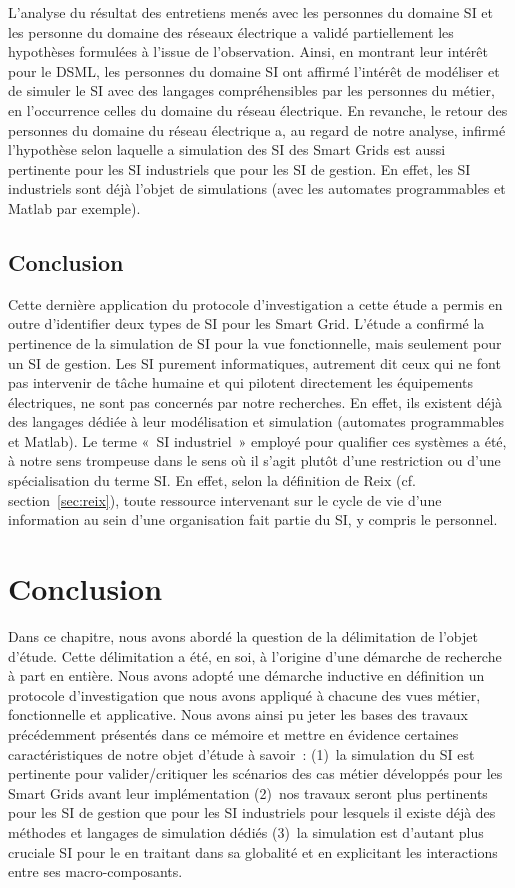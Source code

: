 L'analyse du résultat des entretiens menés avec les personnes du domaine SI et
les personne du domaine des réseaux électrique a validé partiellement les
hypothèses formulées à l'issue de l'observation. Ainsi, en montrant leur intérêt
pour le DSML, les personnes du domaine SI ont affirmé l'intérêt de modéliser et
de simuler le SI avec des langages compréhensibles par les personnes du métier,
en l'occurrence celles du domaine du réseau électrique.  En revanche, le retour
des personnes du domaine du réseau électrique a, au regard de notre analyse,
infirmé l'hypothèse selon laquelle a simulation des SI des Smart Grids est aussi
pertinente pour les SI industriels que pour les SI de gestion. En effet, les SI
industriels sont déjà l'objet de simulations (avec les automates programmables
et Matlab par exemple).

            \subsection{Conclusion} Cette dernière application du protocole
d'investigation a cette étude a permis en outre d'identifier deux types de SI
pour les Smart Grid. L'étude a confirmé la pertinence de la simulation de SI
pour la vue fonctionnelle, mais seulement pour un SI de gestion. Les SI purement
informatiques, autrement dit ceux qui ne font pas intervenir de tâche humaine et
qui pilotent directement les équipements électriques, ne sont pas concernés par
notre recherches. En effet, ils existent déjà des langages dédiée à leur
modélisation et simulation (automates programmables et Matlab). Le terme «~SI
industriel~» employé pour qualifier ces systèmes a été, à notre sens trompeuse
dans le sens où il s'agit plutôt d'une restriction ou d'une spécialisation du
terme SI. En effet, selon la définition de Reix (cf. section~\ref{sec:reix}),
toute ressource intervenant sur le cycle de vie d'une information au sein d'une
organisation fait partie du SI, y compris le personnel.
	


\section{Conclusion}

Dans ce chapitre, nous avons abordé la question de la délimitation de l'objet d'étude.
Cette délimitation a été, en soi, à l'origine d'une démarche de recherche à part en entière.
Nous avons adopté une démarche inductive en définition un protocole d'investigation que nous
avons appliqué à chacune des vues métier, fonctionnelle et applicative.
Nous avons ainsi pu jeter les bases des travaux précédemment présentés dans ce mémoire et 
mettre en évidence certaines caractéristiques de notre objet d'étude à savoir~:
(1)~la simulation du SI est pertinente pour valider/critiquer les scénarios des cas métier développés pour
les Smart Grids avant leur implémentation (2)~nos travaux seront plus pertinents pour les SI de
gestion que pour les SI industriels pour lesquels il existe déjà des méthodes et langages de simulation dédiés
(3)~la simulation est d'autant plus cruciale SI pour le en traitant dans sa globalité et en explicitant les interactions
entre ses macro-composants. 


